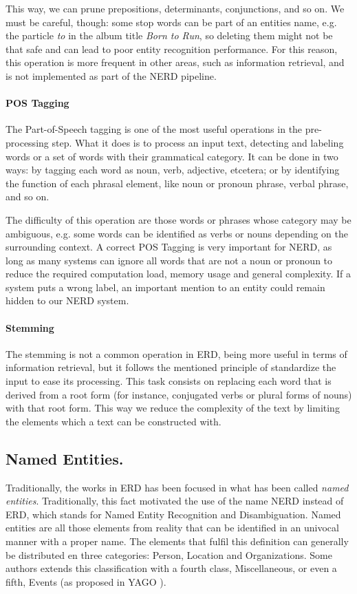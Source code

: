 This way, we can prune prepositions, determinants, conjunctions, and so on. We must be careful, though: some stop words can be part of an entities name, e.g. the particle \emph{to} in the album title \textit{Born to Run}, so deleting them might not be that safe and can lead to poor entity recognition performance. For this reason, this operation is more frequent in other areas, such as information retrieval, and is not implemented as part of the NERD pipeline.

\paragraph{POS Tagging}
The Part-of-Speech tagging is one of the most useful operations in the pre-processing step. What it does is to process an input text, detecting and labeling words or a set of words with their grammatical category. It can be done in two ways: by tagging each word as noun, verb, adjective, etcetera; or by identifying the function of each phrasal element, like noun or pronoun phrase, verbal phrase, and so on.

The difficulty of this operation are those words or phrases whose category may be ambiguous, e.g. some words can be identified as verbs or nouns depending on the surrounding context. A correct POS Tagging is very important for NERD, as long as many systems can ignore all words that are not a noun or pronoun to reduce the required computation load, memory usage and general complexity. If a system puts a wrong label, an important mention to an entity could remain hidden to our NERD system.

\paragraph{Stemming}
The stemming is not a common operation in ERD, being more useful in terms of information retrieval, but it follows the mentioned principle of standardize the input to ease its processing. This task consists on replacing each word that is derived from a root form (for instance, conjugated verbs or plural forms of nouns) with that root form. This way we reduce the complexity of the text by limiting the elements which a text can be constructed with.

\subsection{Named Entities.}

Traditionally, the works in ERD has been focused in what has been called \emph{named entities}. Traditionally, this fact motivated the use of the name NERD instead of ERD, which stands for Named Entity Recognition and Disambiguation. Named entities are all those elements from reality that can be identified in an univocal manner with a proper name. The elements that fulfil this definition can generally be distributed en three categories: Person, Location and Organizations. Some authors extends this classification with a fourth class, Miscellaneous, or even a fifth, Events (as proposed in YAGO \cite{yago2007}).


